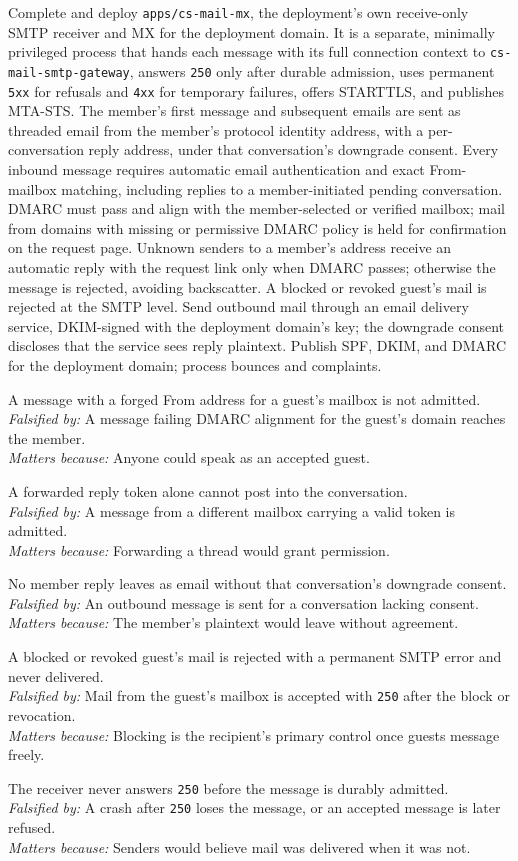 \documentclass[11pt]{article}
\newenvironment{claims}{\begin{description}[leftmargin=1em,style=nextline,itemsep=0.4em]}{\end{description}}
\newcommand{\claim}[4]{\Needspace{6\baselineskip}\item[Claim (#1).] #2\\
    \textit{Falsified by:} #3\\
    \textit{Matters because:} #4}
\begin{document}
Complete and deploy \texttt{apps/cs-mail-mx}, the deployment's own receive-only SMTP
receiver and MX for the deployment domain. It is a separate, minimally privileged
process that hands each message with its full connection context to
\texttt{cs-mail-smtp-gateway}, answers \texttt{250} only after durable admission,
uses permanent \texttt{5xx} for refusals and \texttt{4xx} for temporary failures,
offers STARTTLS, and publishes MTA-STS. The member's first message and subsequent
emails are sent as threaded email from the member's
protocol identity address, with a per-conversation reply address, under that
conversation's downgrade consent. Every inbound message requires automatic
email authentication and exact From-mailbox matching, including replies to a
member-initiated pending conversation. DMARC must pass and align with the
member-selected or verified mailbox; mail from domains with missing or
permissive DMARC policy is held for confirmation on the request page. Unknown
senders to a member's address receive an automatic reply with the request link
only when DMARC passes; otherwise the message is rejected, avoiding backscatter.
A blocked or revoked guest's mail is rejected at the SMTP level.
Send outbound mail through an email delivery service, DKIM-signed with the
deployment domain's key; the downgrade consent discloses that the service sees
reply plaintext. Publish SPF, DKIM, and DMARC for the deployment domain; process
bounces and complaints.

\begin{claims}
\claim{integration}{A message with a forged From address for a guest's mailbox is not admitted.}
    {A message failing DMARC alignment for the guest's domain reaches the member.}
    {Anyone could speak as an accepted guest.}
\claim{integration}{A forwarded reply token alone cannot post into the conversation.}
    {A message from a different mailbox carrying a valid token is admitted.}
    {Forwarding a thread would grant permission.}
\claim{PostgreSQL}{No member reply leaves as email without that conversation's downgrade consent.}
    {An outbound message is sent for a conversation lacking consent.}
    {The member's plaintext would leave without agreement.}
\claim{integration}{A blocked or revoked guest's mail is rejected with a permanent SMTP error and never delivered.}
    {Mail from the guest's mailbox is accepted with \texttt{250} after the block or revocation.}
    {Blocking is the recipient's primary control once guests message freely.}
\claim{PostgreSQL, crash injection}{The receiver never answers \texttt{250} before the message is durably admitted.}
    {A crash after \texttt{250} loses the message, or an accepted message is later refused.}
    {Senders would believe mail was delivered when it was not.}
\end{claims}
\end{document}
